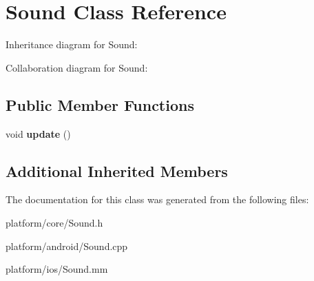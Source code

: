\hypertarget{class_sound}{\section{Sound Class Reference}
\label{class_sound}
}


Inheritance diagram for Sound\+:


Collaboration diagram for Sound\+:
\subsection*{Public Member Functions}
\begin{DoxyCompactItemize}
\item 
\hypertarget{class_sound_a1363950fc24a88df0c358f453843b80c}{void {\bfseries update} ()}\label{class_sound_a1363950fc24a88df0c358f453843b80c}

\end{DoxyCompactItemize}
\subsection*{Additional Inherited Members}


The documentation for this class was generated from the following files\+:\begin{DoxyCompactItemize}
\item 
platform/core/Sound.\+h\item 
platform/android/Sound.\+cpp\item 
platform/ios/Sound.\+mm\end{DoxyCompactItemize}
